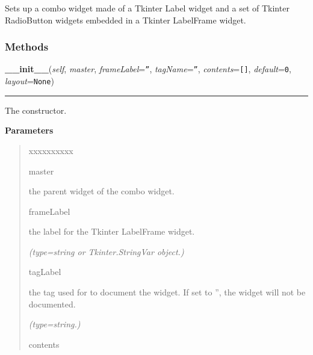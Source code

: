 Sets up a combo widget made of a Tkinter Label widget and a set of Tkinter 
RadioButton widgets embedded in a Tkinter LabelFrame widget.



  \subsubsection{Methods}

    \vspace{0.5ex}

\hspace{.8\funcindent}\begin{boxedminipage}{\funcwidth}

    \raggedright \textbf{\_\_init\_\_}(\textit{self}, \textit{master}, \textit{frameLabel}={\tt ''}, \textit{tagName}={\tt ''}, \textit{contents}={\tt []}, \textit{default}={\tt 0}, \textit{layout}={\tt None})

    \vspace{-1.5ex}

    \rule{\textwidth}{0.5\fboxrule}
\setlength{\parskip}{2ex}
    The constructor.

\setlength{\parskip}{1ex}
      \textbf{Parameters}
      \vspace{-1ex}

      \begin{quote}
        \begin{Ventry}{xxxxxxxxxx}

          \item[master]

          the parent widget of the combo widget.

          \item[frameLabel]

          the label for the Tkinter LabelFrame widget.

            {\it (type=string or Tkinter.StringVar object.)}

          \item[tagLabel]

          the tag used for to document the widget. If set to '', the widget
          will not be documented.

            {\it (type=string.)}

          \item[contents]


\end{Ventry}
\end{quote}
\end{boxedminipage}
